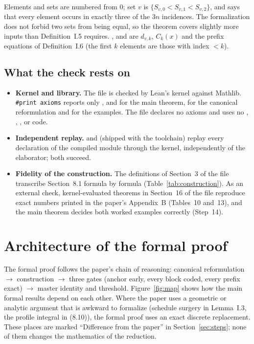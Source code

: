 \documentclass[11pt]{article}
\begin{document}
Elements and sets are numbered from $0$; set $v$ is $\{S_{v,0}<S_{v,1}<S_{v,2}\}$, and
 says that every element occurs in exactly three of the $3n$ incidences. The
formalization does not forbid two sets from being equal, so the theorem covers slightly more
inputs than Definition~I.5 requires. ,  and  are $d_{v,k}$,
$C_k(x)$ and the prefix equations of Definition~I.6 (the first $k$ elements are those with
index $<k$).

\subsection{What the check rests on}

\begin{itemize}[leftmargin=14pt]
\item \textbf{Kernel and library.} The file is checked by Lean's kernel against Mathlib.
  \texttt{\#print axioms} reports only ,  and
   for the main theorem, for the canonical reformulation and for the
  examples. The file declares no axioms and uses no , ,
  ,  or  code.
\item \textbf{Independent replay.}  and 
  (shipped with the toolchain) replay every declaration of the compiled module through the
  kernel, independently of the elaborator; both succeed.
\item \textbf{Fidelity of the construction.} The definitions of Section~3 of the file
  transcribe Section~8.1 formula by formula (Table~\ref{tab:construction}). As an external
  check, kernel-evaluated theorems in Section~16 of the file reproduce exact numbers
  printed in the paper's Appendix~B (Tables~10 and~13), and the main theorem decides both
  worked examples correctly (Step~14).
\end{itemize}

\section{Architecture of the formal proof}\label{sec:architecture}

The formal proof follows the paper's chain of reasoning: canonical reformulation
$\to$ construction $\to$ three gates (anchor early, every block coded, every prefix exact)
$\to$ master identity and threshold. Figure~\ref{fig:map} shows how the main formal results
depend on each other. Where the paper uses a geometric or analytic argument that is awkward
to formalize (schedule surgery in Lemma~I.3, the profile integral in (8.10)), the formal
proof uses an exact discrete replacement. These places are marked ``Difference from the paper''
in Section~\ref{sec:steps}; none of them changes the mathematics of the reduction.
\end{document}
